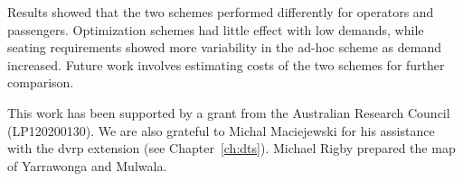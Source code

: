 Results showed that the two schemes performed differently for operators and
passengers. Optimization schemes had little effect with low demands, while
seating requirements showed more variability in the ad-hoc scheme as demand
increased. Future work involves estimating costs of the two schemes for further
comparison.

This work has been supported by a grant from the Australian Research Council (LP120200130). We are also grateful to Michal Maciejewski for his assistance with the \gls{dvrp} extension (see Chapter~\ref{ch:dts}). Michael Rigby prepared the map of Yarrawonga and Mulwala.
